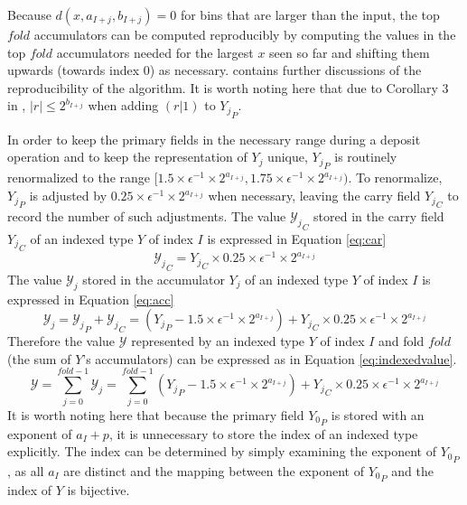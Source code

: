 \documentclass[12pt]{article}
\theoremstyle{plain}
\begin{document}
  Because $d(x, a_{I + j}, b_{I + j}) = 0$ for bins that are larger than the input, the top $fold$ accumulators can be computed reproducibly by computing the values in the top $fold$ accumulators needed for the largest $x$ seen so far and shifting them upwards (towards index $0$) as necessary. \cite{repsum} contains further discussions of the reproducibility of the algorithm.
      It is worth noting here that due to Corollary $3$ in \cite{repsum}, $|r| \leq 2^{b_{I + j}}$ when adding $(r | 1)$ to ${Y_j}_P$.

      In order to keep the primary fields in the necessary range during a deposit operation and to keep the representation of $Y_j$ unique, ${Y_j}_P$ is routinely renormalized to the range $[1.5 \times\epsilon^{-1} \times 2^{a_{I + j}}, 1.75 \times\epsilon^{-1} \times 2^{a_{I + j}})$.
      To renormalize, ${Y_j}_P$ is adjusted by $0.25 \times\epsilon^{-1} \times 2^{a_{I + j}}$ when necessary, leaving the carry field ${Y_j}_C$ to record the number of such adjustments.
      The value ${\mathcal{Y}_j}_C$ stored in the carry field ${Y_j}_C$ of an indexed type $Y$ of index $I$ is expressed in Equation \ref{eq:car}
      \begin{equation}
        {\mathcal{Y}_j}_C = {Y_j}_C \times 0.25\times\epsilon^{-1}\times2^{a_{I + j}}
        \label{eq:car}
      \end{equation}
      The value $\mathcal{Y}_j$ stored in the accumulator $Y_j$ of an indexed type $Y$ of index $I$ is expressed in Equation \ref{eq:acc}
      \begin{equation}
        \mathcal{Y}_j = {\mathcal{Y}_j}_P + {\mathcal{Y}_j}_C = ({Y_j}_P - 1.5 \times\epsilon^{-1}\times 2^{a_{I + j}}) + {Y_j}_C \times 0.25\times\epsilon^{-1}\times2^{a_{I + j}}
        \label{eq:acc}
      \end{equation}
      Therefore the value $\mathcal{Y}$ represented by an indexed type $Y$ of index $I$ and fold $fold$ (the sum of $Y$'s accumulators) can be expressed as in Equation \ref{eq:indexedvalue}.
      \begin{equation}
        \mathcal{Y} = \sum\limits_{j = 0}^{fold - 1} \mathcal{Y}_j = \sum\limits_{j = 0}^{fold - 1} ({Y_j}_P - 1.5 \times\epsilon^{-1}\times 2^{a_{I + j}}) + {Y_j}_C \times 0.25\times\epsilon^{-1}\times2^{a_{I + j}}
        \label{eq:indexedvalue}
      \end{equation}
      It is worth noting here that because the primary field ${Y_0}_P$ is stored with an exponent of $a_I + p$, it is unnecessary to store the index of an indexed type explicitly. The index can be determined by simply examining the exponent of ${Y_0}_P$, as all $a_I$ are distinct and the mapping between the exponent of ${Y_0}_P$ and the index of $Y$ is bijective.
\end{document}
